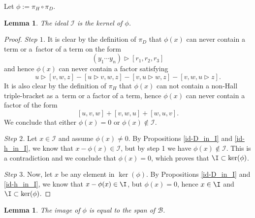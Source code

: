 \documentclass[pdftex]{sigma}
\numberwithin{equation}{section}
\newtheorem{Lemma}[Theorem]{Lemma}
\begin{document}
Let $\phi := \pi_H \circ \pi_D$.


\begin{Lemma}\label{lemma:ker}
The ideal $\mathcal{I}$ is the kernel of $\phi$.
\end{Lemma}

\begin{proof}
\textit{Step $1$.} It is clear by the definition of $\pi_D$ that $\phi(x)$ can never contain a term or a~factor of a term on the form
\[
(y_1 \cdots y_n) \rhd [r_1, r_2, r_3]
\]
and hence $\phi(x)$ can never contain a factor satisfying
\[
u \rhd [v,w,z] - [u\rhd v ,w,z] - [v, u \rhd w , z] - [v,w,u \rhd z].
\]
It is also clear by the definition of $\pi_H$ that $\phi(x)$ can not contain a non-Hall triple-bracket as a~term or a factor of a term, hence $\phi(x)$ can never contain a factor of the form
\[
[u,v,w] + [v,w,u] + [w,u,v].
\]
We conclude that either $\phi(x)=0$ or $\phi(x) \notin \mathcal{I}$.

\textit{Step $2$.} Let $x \in \mathcal{I}$ and assume $\phi(x) \neq 0$. By Propositions \ref{id-D_in_I} and \ref{id-h_in_I}, we know that $x-\phi(x)\in \mathcal{I}$, but by step 1 we have $\phi(x) \notin \mathcal{I}$. This is a contradiction and we conclude that $\phi(x)=0$, which proves that $\I \subset \ker(\phi)$.

\textit{Step $3$.} Now, let $x$ be any element in $\ker(\phi)$. By Propositions \ref{id-D_in_I} and \ref{id-h_in_I}, we know that $x- \phi(x) \in \I$, but $\phi(x)=0$, hence $x\in \I$ and $\I \subset \ker(\phi)$.
\end{proof}


\begin{Lemma}\label{lemma:Im}
The image of $\phi$ is equal to the span of $\mathcal{B}$.
\end{Lemma}
\end{document}
